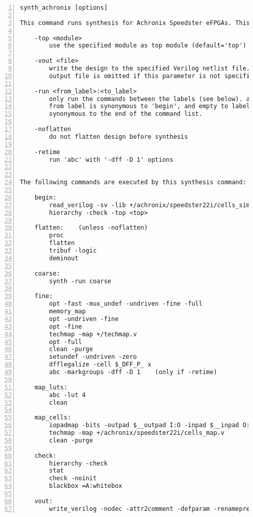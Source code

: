 \begin{lstlisting}[numbers=left,frame=single]
    synth_achronix [options]

This command runs synthesis for Achronix Speedster eFPGAs. This work is still experimental.

    -top <module>
        use the specified module as top module (default='top')

    -vout <file>
        write the design to the specified Verilog netlist file. writing of an
        output file is omitted if this parameter is not specified.

    -run <from_label>:<to_label>
        only run the commands between the labels (see below). an empty
        from label is synonymous to 'begin', and empty to label is
        synonymous to the end of the command list.

    -noflatten
        do not flatten design before synthesis

    -retime
        run 'abc' with '-dff -D 1' options


The following commands are executed by this synthesis command:

    begin:
        read_verilog -sv -lib +/achronix/speedster22i/cells_sim.v
        hierarchy -check -top <top>

    flatten:    (unless -noflatten)
        proc
        flatten
        tribuf -logic
        deminout

    coarse:
        synth -run coarse

    fine:
        opt -fast -mux_undef -undriven -fine -full
        memory_map
        opt -undriven -fine
        opt -fine
        techmap -map +/techmap.v
        opt -full
        clean -purge
        setundef -undriven -zero
        dfflegalize -cell $_DFF_P_ x
        abc -markgroups -dff -D 1    (only if -retime)

    map_luts:
        abc -lut 4
        clean

    map_cells:
        iopadmap -bits -outpad $__outpad I:O -inpad $__inpad O:I
        techmap -map +/achronix/speedster22i/cells_map.v
        clean -purge

    check:
        hierarchy -check
        stat
        check -noinit
        blackbox =A:whitebox

    vout:
        write_verilog -nodec -attr2comment -defparam -renameprefix syn_ <file-name>
\end{lstlisting}

